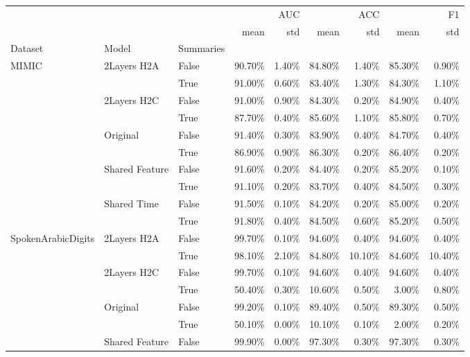 \begin{tabular}{lllrrrrrr}
\toprule
 &  &  & \multicolumn{2}{r}{AUC} & \multicolumn{2}{r}{ACC} & \multicolumn{2}{r}{F1} \\
 &  &  & mean & std & mean & std & mean & std \\
Dataset & Model & Summaries &  &  &  &  &  &  \\
\midrule
\multirow[t]{10}{*}{MIMIC} & \multirow[t]{2}{*}{2Layers H2A} & False & 90.70\% & 1.40\% & 84.80\% & 1.40\% & 85.30\% & 0.90\% \\
 &  & True & 91.00\% & 0.60\% & 83.40\% & 1.30\% & 84.30\% & 1.10\% \\
\cline{2-9}
 & \multirow[t]{2}{*}{2Layers H2C} & False & 91.00\% & 0.90\% & 84.30\% & 0.20\% & 84.90\% & 0.40\% \\
 &  & True & 87.70\% & 0.40\% & 85.60\% & 1.10\% & 85.80\% & 0.70\% \\
\cline{2-9}
 & \multirow[t]{2}{*}{Original} & False & 91.40\% & 0.30\% & 83.90\% & 0.40\% & 84.70\% & 0.40\% \\
 &  & True & 86.90\% & 0.90\% & 86.30\% & 0.20\% & 86.40\% & 0.20\% \\
\cline{2-9}
 & \multirow[t]{2}{*}{Shared Feature} & False & 91.60\% & 0.20\% & 84.40\% & 0.20\% & 85.20\% & 0.10\% \\
 &  & True & 91.10\% & 0.20\% & 83.70\% & 0.40\% & 84.50\% & 0.30\% \\
\cline{2-9}
 & \multirow[t]{2}{*}{Shared Time} & False & 91.50\% & 0.10\% & 84.20\% & 0.20\% & 85.00\% & 0.20\% \\
 &  & True & 91.80\% & 0.40\% & 84.50\% & 0.60\% & 85.20\% & 0.50\% \\
\cline{1-9} \cline{2-9}
\multirow[t]{10}{*}{SpokenArabicDigits} & \multirow[t]{2}{*}{2Layers H2A} & False & 99.70\% & 0.10\% & 94.60\% & 0.40\% & 94.60\% & 0.40\% \\
 &  & True & 98.10\% & 2.10\% & 84.80\% & 10.10\% & 84.60\% & 10.40\% \\
\cline{2-9}
 & \multirow[t]{2}{*}{2Layers H2C} & False & 99.70\% & 0.10\% & 94.60\% & 0.40\% & 94.60\% & 0.40\% \\
 &  & True & 50.40\% & 0.30\% & 10.60\% & 0.50\% & 3.00\% & 0.80\% \\
\cline{2-9}
 & \multirow[t]{2}{*}{Original} & False & 99.20\% & 0.10\% & 89.40\% & 0.50\% & 89.30\% & 0.50\% \\
 &  & True & 50.10\% & 0.00\% & 10.10\% & 0.10\% & 2.00\% & 0.20\% \\
\cline{2-9}
 & \multirow[t]{2}{*}{Shared Feature} & False & 99.90\% & 0.00\% & 97.30\% & 0.30\% & 97.30\% & 0.30\% \\

\end{tabular}
